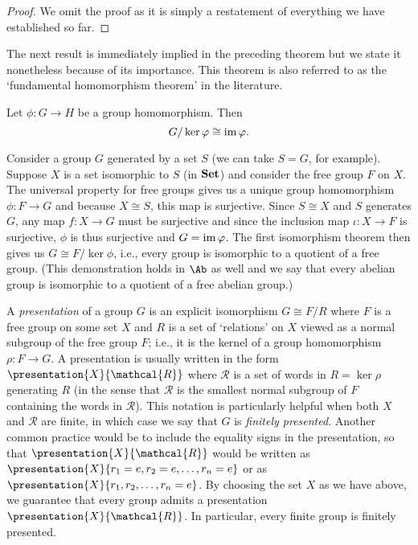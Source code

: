 \begin{proof}
    We omit the proof as it is simply a restatement of everything we have
    established so far.
\end{proof}

The next result is immediately implied in the preceding theorem but we state it
nonetheless because of its importance. This theorem is also referred to as the
`fundamental homomorphism theorem' in the literature.

\begin{theorem}
    \label{thm:first-isomorphism}
    Let \(\phi: G \to H\) be a group homomorphism. Then
    \[
        G/\ker \varphi \cong \operatorname{im} \varphi.
    \]
\end{theorem}

\begin{example}
    Consider a group \(G\) generated by a set \(S\) (we can take \(S = G\), for
    example). Suppose \(X\) is a set isomorphic to \(S\) (in \(\mathbf{Set}\)) and
    consider the free group \(F\) on \(X\). The universal property for free
    groups gives us a unique group homomorphism \(\phi: F \to G\) and because
    \(X \cong S\), this map is surjective. Since \(S \cong X\) and \(S\)
    generates \(G\), any map \(f: X \to G\) must be surjective and since the
    inclusion map \(\iota: X \to F\) is surjective, \(\phi\) is thus surjective
    and \(G = \operatorname{im} \varphi\). The first isomorphism theorem then gives us \(G \cong
    F/\ker \phi\), i.e., every group is isomorphic to a quotient of a free
    group. (This demonstration holds in \(\Ab\) as well and we say that every
    abelian group is isomorphic to a quotient of a free abelian group.)

    A \emph{presentation} of a group \(G\) is an explicit isomorphism \(G \cong
    F/R\) where \(F\) is a free group on some set \(X\) and \(R\) is a set of
    `relations' on \(X\) viewed as a normal subgroup of the free group \(F\);
    i.e., it is the kernel of a group homomorphism \(\rho: F \to G\). A
    presentation is usually written in the form
    \(\presentation{X}{\mathcal{R}}\) where \(\mathcal{R}\) is a set of words in
    \(R = \ker\rho\) generating \(R\) (in the sense that \(\mathcal{R}\) is the
    smallest normal subgroup of \(F\) containing the words in \(\mathcal{R}\)).
    This notation is particularly helpful when both \(X\) and \(\mathcal{R}\)
    are finite, in which case we say that \(G\) is \emph{finitely presented}.
    Another common practice would be to include the equality signs in the
    presentation, so that \(\presentation{X}{\mathcal{R}}\) would be written as
    \(\presentation{X}{r_1 = e, r_2 = e, \ldots, r_n = e}\) or as
    \(\presentation{X}{r_1, r_2, \ldots, r_n = e}\). By choosing the set \(X\)
    as we have above, we guarantee that every group admits a presentation
    \(\presentation{X}{\mathcal{R}}\). In particular, every finite group is
    finitely presented.


\end{example}
